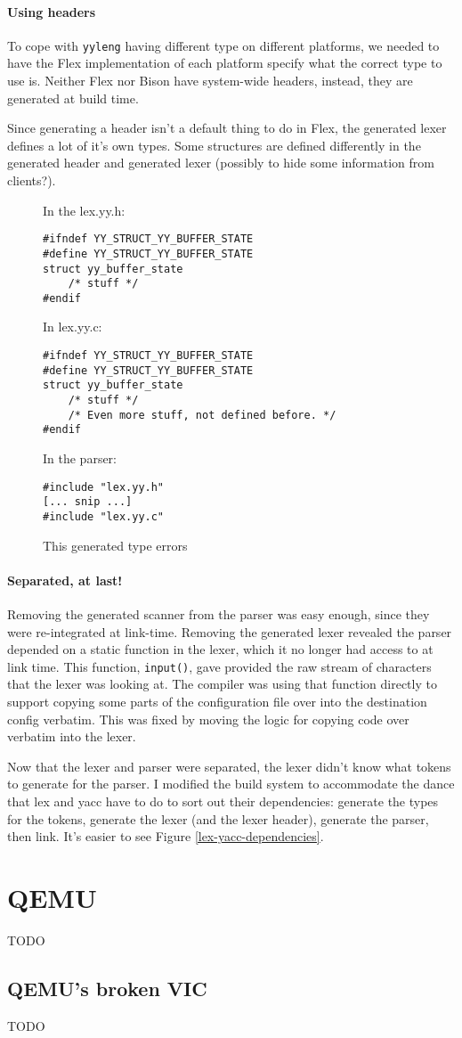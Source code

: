 \documentclass[12pt]{article}
\newcommand{\TODO}[1]{{\huge\color{red}TODO \Large #1}}
\newcommand{\code}[1]{{\tt #1}}
\begin{document}
\paragraph{Using headers}
To cope with \code{yyleng} having different type on different platforms, we
needed to have the Flex implementation of each platform specify what the
correct type to use is. Neither Flex nor Bison have system-wide headers,
instead, they are generated at build time.

Since generating a header isn't a default thing to do in Flex, the generated
lexer defines a lot of it's own types. Some structures are defined differently
in the generated header and generated lexer (possibly to hide some information
from clients?).

\begin{figure}
\label{include-c-h}\caption{This generated type errors}
In the lex.yy.h:
\begin{verbatim}
#ifndef YY_STRUCT_YY_BUFFER_STATE
#define YY_STRUCT_YY_BUFFER_STATE
struct yy_buffer_state
    /* stuff */
#endif
\end{verbatim}

In lex.yy.c:
\begin{verbatim}
#ifndef YY_STRUCT_YY_BUFFER_STATE
#define YY_STRUCT_YY_BUFFER_STATE
struct yy_buffer_state
    /* stuff */
    /* Even more stuff, not defined before. */
#endif
\end{verbatim}

In the parser:
\begin{verbatim}
#include "lex.yy.h"
[... snip ...]
#include "lex.yy.c"
\end{verbatim}
\end{figure}

\paragraph{Separated, at last!}
Removing the generated scanner from the parser was easy enough, since they were
re-integrated at link-time. Removing the generated lexer revealed the 
parser depended on a static function in the lexer, which it no longer had
access to at link time. This function, \code{input()}, gave provided the raw
stream of characters that the lexer was looking at. The compiler was using that
function directly to support copying some parts of the configuration file over
into the destination config verbatim. This was fixed by moving the logic for
copying code over verbatim into the lexer.

Now that the lexer and parser were separated, the lexer didn't know what tokens
to generate for the parser. I modified the build system to accommodate the dance
that lex and yacc have to do to sort out their dependencies: generate the types
for the tokens, generate the lexer (and the lexer header), generate the parser,
then link. It's easier to see Figure \ref{lex-yacc-dependencies}.

\section{QEMU}

\TODO{}

\subsection{QEMU's broken VIC}

\TODO{}
\end{document}
